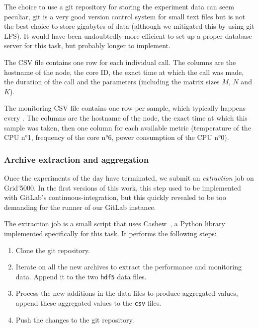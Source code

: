                 The choice to use a git repository for storing the experiment data can seem peculiar, git is a very good
                version control system for small text files but is not the best choice to store gigabytes of data
                (although we mitigated this by using git LFS). It would have been undoubtedly more efficient to set up a
                proper database server for this task, but probably longer to implement.

                The \dgemm CSV file contains one row for each individual \dgemm call. The columns are the hostname of
                the node, the core ID, the exact time at which the call was made, the duration of the call and the
                \dgemm parameters (including the matrix sizes \(M\), \(N\) and \(K\)).

                The monitoring CSV file contains one row per sample, which typically happens every . The
                columns are the hostname of the node, the exact time at which this sample was taken, then one column for
                each available metric (\eg temperature of the CPU n°1, frequency of the core n°6, power consumption of
                the CPU n°0).

            \subsubsection{Archive extraction and aggregation}%

                Once the experiments of the day have terminated, we submit an \emph{extraction} job on Grid'5000. In the
                first versions of this work, this step used to be implemented with GitLab's continuous-integration, but
                this quickly revealed to be too demanding for the runner of our GitLab instance.

                The extraction job is a small script that uses
                Cashew~\cite{cashew}, a Python library implemented specifically
                for this task. It performs the following steps:
                \begin{enumerate}
                    \item Clone the git repository.
                    \item Iterate on all the new archives to extract the performance and monitoring data. Append it to
                        the two \texttt{hdf5} data files.
                    \item Process the new additions in the data files to produce aggregated values, append these
                        aggregated values to the \texttt{csv} files.
                    \item Push the changes to the git repository.
                \end{enumerate}

